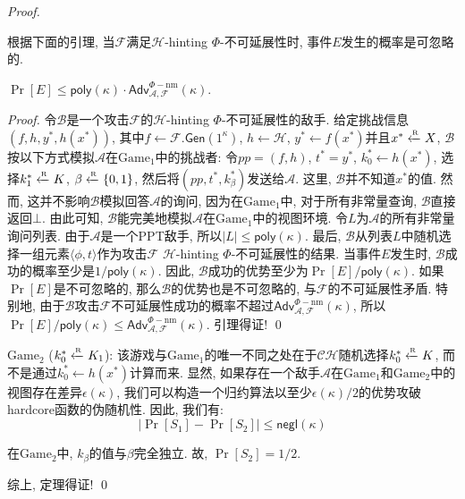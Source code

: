\begin{proof}
\begin{trivlist}
根据下面的引理, 当$\mathcal{F}$满足$\mathcal{H}$-hinting $\Phi$-不可延展性时, 事件$E$发生的概率是可忽略的.
\begin{claim}\label{lemma:AKDF-hinting-NM}
	$\Pr[E] \leq \mathsf{poly}(\kappa)\cdot \mathsf{Adv}_{\mathcal{A}, \mathcal{F}}^{\Phi-\text{nm}}(\kappa)$. 
\end{claim} 

\begin{proof}
令$\mathcal{B}$是一个攻击$\mathcal{F}$的$\mathcal{H}$-hinting $\Phi$-不可延展性的敌手. 给定挑战信息$(f, h, y^*, h(x^*))$, 其中$f \leftarrow \mathcal{F}.\mathsf{Gen}(1^\kappa)$, $h \leftarrow \mathcal{H}$, $y^* \leftarrow f(x^*)$并且$x^* \xleftarrow{\textup{\tiny R}} X$, $\mathcal{B}$按以下方式模拟$\mathcal{A}$在$\text{Game}_1$中的挑战者: 令$pp = (f, h)$, $t^* = y^*$, $k_0^* \leftarrow h(x^*)$, 选择$k_1^* \xleftarrow{\textup{\tiny R}} K$, $\beta \xleftarrow{\textup{\tiny R}} \{0,1\}$, 然后将$(pp, t^*, k_\beta^*)$发送给$\mathcal{A}$. 这里, $\mathcal{B}$并不知道$x^*$的值. 然而, 这并不影响$\mathcal{B}$模拟回答$\mathcal{A}$的询问, 因为在$\text{Game}_1$中, 对于所有非常量查询, $\mathcal{B}$直接返回$\bot$. 由此可知, $\mathcal{B}$能完美地模拟$\mathcal{A}$在$\text{Game}_1$中的视图环境. 令$L$为$\mathcal{A}$的所有非常量询问列表. 由于$\mathcal{A}$是一个PPT敌手, 所以$|L| \leq \mathsf{poly}(\kappa)$. 最后, $\mathcal{B}$从列表$L$中随机选择一组元素$\langle \phi, t\rangle$作为攻击$\mathcal{F}$ $\mathcal{H}$-hinting $\Phi$-不可延展性的结果. 当事件$E$发生时, $\mathcal{B}$成功的概率至少是$1/\mathsf{poly}(\kappa)$. 因此, $\mathcal{B}$成功的优势至少为$\Pr[E]/\mathsf{poly}(\kappa)$. 如果$\Pr[E]$是不可忽略的, 那么$\mathcal{B}$的优势也是不可忽略的, 与$\mathcal{F}$的不可延展性矛盾. 特别地, 由于$\mathcal{B}$攻击$\mathcal{F}$不可延展性成功的概率不超过$\mathsf{Adv}_{\mathcal{A}, \mathcal{F}}^{\Phi-\text{nm}}(\kappa)$, 所以 $\Pr[E]/\mathsf{poly}(\kappa) \leq \mathsf{Adv}_{\mathcal{A}, \mathcal{F}}^{\Phi-\text{nm}}(\kappa)$. 引理得证! \qed 
\end{proof}

\item $\text{Game}_2$ ($k_0^* \xleftarrow{\textup{\tiny R}} K_1$): 该游戏与$\text{Game}_1$的唯一不同之处在于$\mathcal{CH}$随机选择$k_0^* \xleftarrow{\textup{\tiny R}} K$, 而不是通过$k_0^* \leftarrow h(x^*)$计算而来. 显然, 如果存在一个敌手$\mathcal{A}$在$\text{Game}_1$和$\text{Game}_2$中的视图存在差异$\epsilon(\kappa)$, 我们可以构造一个归约算法以至少$\epsilon(\kappa)/2$的优势攻破hardcore函数的伪随机性. 因此, 我们有: 
    \begin{equation*}
        |\Pr[S_1] - \Pr[S_2]| \leq \mathsf{negl}(\kappa)
    \end{equation*} 

在$\text{Game}_2$中, $k_\beta$的值与$\beta$完全独立. 故, $\Pr[S_2] = 1/2$.  
\end{trivlist}

综上, 定理得证! \qed 
\end{proof} 


